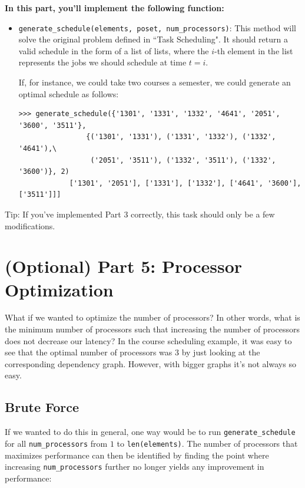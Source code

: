 \documentclass{article}
\begin{document}
    \begin{tcolorbox}[colback=yellow!30]
        \textbf{In this part, you'll implement the following function:}
        \begin{itemize}
            \item \lstinline{generate_schedule(elements, poset, num_processors)}:  This method will solve the original problem defined in ``Task Scheduling". It should return a valid schedule in the form of a list of lists, where the $i$-th element in the list represents the jobs we should schedule at time $t = i$.

        If, for instance, we could take two courses a semester, we could generate an optimal schedule as follows:
    \begin{lstlisting}[belowskip=-10pt]
        >>> generate_schedule({'1301', '1331', '1332', '4641', '2051', '3600', '3511'},
                {('1301', '1331'), ('1331', '1332'), ('1332', '4641'),\
                 ('2051', '3511'), ('1332', '3511'), ('1332', '3600')}, 2)
            ['1301', '2051'], ['1331'], ['1332'], ['4641', '3600'], ['3511']]]
    \end{lstlisting}
        \end{itemize}
        Tip: If you've implemented Part 3 correctly, this task should only be a few modifications.
        
    \end{tcolorbox}



    \section*{(Optional) Part 5: Processor Optimization}
    What if we wanted to optimize the number of processors? In other words, what is the minimum number of processors such that increasing the number of processors does not decrease our latency? In the course scheduling example, it was easy to see that the optimal number of processors was $3$ by just looking at the corresponding dependency graph. However, with bigger graphs it's not always so easy.
    
    \subsection*{Brute Force}
    If we wanted to do this in general, one way would be to run \lstinline{generate_schedule} for all \lstinline{num_processors} from $1$ to \lstinline{len(elements)}. The number of processors that maximizes performance can then be identified by finding the point where increasing \lstinline{num_processors} further no longer yields any improvement in performance:
    
\end{document}
